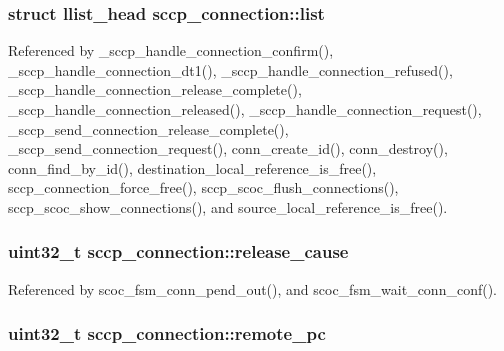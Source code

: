 \subsubsection[{list}]{\setlength{\rightskip}{0pt plus 5cm}struct llist\+\_\+head sccp\+\_\+connection\+::list}\label{structsccp__connection_acf16c888b097c26679f6adc9cb8a7e81}


Referenced by \+\_\+sccp\+\_\+handle\+\_\+connection\+\_\+confirm(), \+\_\+sccp\+\_\+handle\+\_\+connection\+\_\+dt1(), \+\_\+sccp\+\_\+handle\+\_\+connection\+\_\+refused(), \+\_\+sccp\+\_\+handle\+\_\+connection\+\_\+release\+\_\+complete(), \+\_\+sccp\+\_\+handle\+\_\+connection\+\_\+released(), \+\_\+sccp\+\_\+handle\+\_\+connection\+\_\+request(), \+\_\+sccp\+\_\+send\+\_\+connection\+\_\+release\+\_\+complete(), \+\_\+sccp\+\_\+send\+\_\+connection\+\_\+request(), conn\+\_\+create\+\_\+id(), conn\+\_\+destroy(), conn\+\_\+find\+\_\+by\+\_\+id(), destination\+\_\+local\+\_\+reference\+\_\+is\+\_\+free(), sccp\+\_\+connection\+\_\+force\+\_\+free(), sccp\+\_\+scoc\+\_\+flush\+\_\+connections(), sccp\+\_\+scoc\+\_\+show\+\_\+connections(), and source\+\_\+local\+\_\+reference\+\_\+is\+\_\+free().

\subsubsection[{release\+\_\+cause}]{\setlength{\rightskip}{0pt plus 5cm}uint32\+\_\+t sccp\+\_\+connection\+::release\+\_\+cause}\label{structsccp__connection_a842ccccb6d3c9bbfc9f4f986830c2ee7}


Referenced by scoc\+\_\+fsm\+\_\+conn\+\_\+pend\+\_\+out(), and scoc\+\_\+fsm\+\_\+wait\+\_\+conn\+\_\+conf().

\subsubsection[{remote\+\_\+pc}]{\setlength{\rightskip}{0pt plus 5cm}uint32\+\_\+t sccp\+\_\+connection\+::remote\+\_\+pc}\label{structsccp__connection_ae1bdc4cfbc68d1cd36dbf1bf5aa3ecad}


